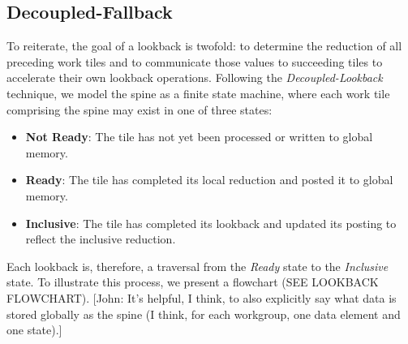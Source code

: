 \documentclass[sigconf]{acmart}
\newcommand{\john}[1]{{\footnotesize\color{cyan}[John: #1]}}
\begin{document}
\subsection{Decoupled-Fallback}
To reiterate, the goal of a lookback is twofold: to determine the reduction of all preceding work tiles and to communicate those values to succeeding tiles to accelerate their own lookback operations. Following the \emph{Decoupled-Lookback} technique, we model the spine as a finite state machine, where each work tile comprising the spine may exist in one of three states:
\begin{itemize}
  \item \textbf{Not Ready}: The tile has not yet been processed or written to global memory.
  \item \textbf{Ready}: The tile has completed its local reduction and posted it to global memory.
  \item \textbf{Inclusive}: The tile has completed its lookback and updated its posting to reflect the inclusive reduction.
\end{itemize}
Each lookback is, therefore, a traversal from the \emph{Ready} state to the \emph{Inclusive} state. To illustrate this process, we present a flowchart (SEE LOOKBACK FLOWCHART).
\john{It's helpful, I think, to also explicitly say what data is stored globally as the spine (I think, for each workgroup, one data element and one state).}
\end{document}

